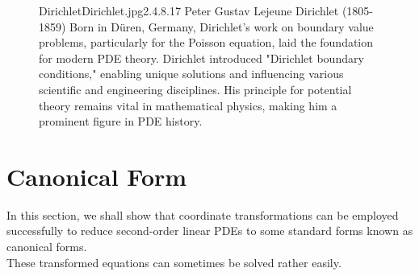 \begin{figure}[b]
    \begin{minipage}[h]{\textwidth}
        \begin{enrichment}{Dirichlet}{Dirichlet.jpg}{2.4}{.8}{.17}
            Peter Gustav Lejeune Dirichlet (1805-1859)  Born in Düren, Germany, Dirichlet's work on boundary value problems, particularly for the Poisson equation, laid the foundation for modern PDE theory. Dirichlet introduced "Dirichlet boundary conditions," enabling unique solutions and influencing various scientific and engineering disciplines. His principle for potential theory remains vital in mathematical physics, making him a prominent figure in PDE history.
        \end{enrichment}
    \end{minipage}
\end{figure}


\newpage
\section{Canonical Form}
In this section, we shall show that coordinate transformations can be employed successfully to reduce second-order linear PDEs to some standard forms known as canonical forms. 
\\
These transformed equations can sometimes be solved rather easily.


